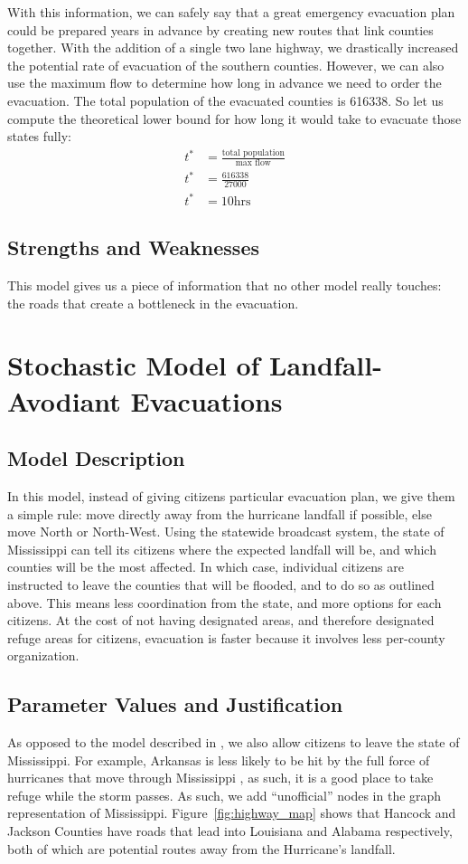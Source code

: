 \documentclass[titlepage]{article}
\begin{document}
    With this information, we can safely say that a great emergency evacuation plan could be prepared years in advance by creating new routes that link counties together. With the addition of a single two lane highway, we drastically increased the potential rate of evacuation of the southern counties. However, we can also use the maximum flow to determine how long in advance we need to order the evacuation.
    The total population of the evacuated counties is 616338. So let us compute the theoretical lower bound for how long it would take to evacuate those states fully:
    \begin{align*}
        t^* &= \frac{\text{total population}}{\text{max flow}}\\
        t^* &= \frac{616338}{27000}\\
        t^* &= 10 \text{hrs}
    \end{align*}
  \subsection{Strengths and Weaknesses}
    This model gives us a piece of information that no other model really touches: the roads that create a bottleneck in the evacuation. 

\section{Stochastic Model of Landfall-Avodiant Evacuations}
\label{sec:stochastic}
  \subsection{Model Description}
    \par In this model, instead of giving citizens particular evacuation plan, we give them a simple rule: move directly away from the hurricane landfall if possible, else move North or North-West. Using the statewide broadcast system, the state of Mississippi can tell its citizens where the expected landfall will be, and which counties will be the most affected. In which case, individual citizens are instructed to leave the counties that will be flooded, and to do so as outlined above. This means less coordination from the state, and more options for each citizens. At the cost of not having designated areas, and therefore designated refuge areas for citizens, evacuation is faster because it involves less per-county organization.
  \subsection{Parameter Values and Justification}
    \par As opposed to the model described in , we also allow citizens to leave the state of Mississippi. For example, Arkansas is less likely to be hit by the full force of hurricanes that move through Mississippi \cite{5news}, as such, it is a good place to take refuge while the storm passes. As such, we add ``unofficial'' nodes in the graph representation of Mississippi. Figure~\ref{fig:highway_map} shows that Hancock and Jackson Counties have roads that lead into Louisiana and Alabama respectively, both of which are potential routes away from the Hurricane's landfall.
\end{document}
